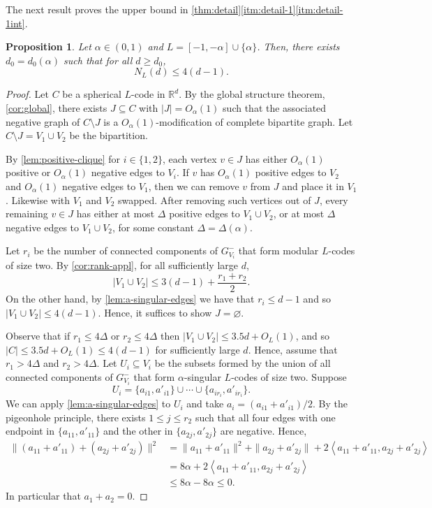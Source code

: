 \documentclass[reqno, 11pt]{amsart}
\newtheorem{proposition}[theorem]{Proposition}
\theoremstyle{definition}
\theoremstyle{remark}
\newcommand{\abs}[1]{\left\lvert#1\right\rvert}
\newcommand{\ang}[1]{\left\langle #1 \right\rangle}
\newcommand{\RR}{\mathbb{R}}
\begin{document}
The next result proves the upper bound in \cref{thm:detail}\ref{itm:detail-1}\ref{itm:detail-1int}.

\begin{proposition}\label{prop:upper}
    Let $ \alpha \in (0,1)$ and $L = [-1,-\alpha]\cup\{\alpha\}$. Then, there exists $d_0 = d_0(\alpha)$ such that for all $d \geq d_0$,
    \[
        N_L(d) \leq 4(d-1).
    \]
\end{proposition}

\begin{proof}
 Let $C$ be a spherical $L$-code in $\RR^d$. By the global structure theorem, \cref{cor:global}, there exists $J \subseteq C$ with $\abs{J} = O_\alpha(1)$ such that the associated negative graph of $C \setminus J$ is a $O_\alpha(1)$-modification of complete bipartite graph. Let $C \setminus J = V_1 \cup V_2$ be the bipartition.

By \cref{lem:positive-clique} for $i \in \{1,2\}$, each vertex $v \in J$ has either $O_\alpha(1)$ positive or $O_\alpha(1)$ negative edges to $V_i$. If $v$ has $O_\alpha(1)$ positive edges to $V_2$ and $O_\alpha(1)$ negative edges to $V_1$, then we can remove $v$ from $J$ and place it in $V_1$. Likewise with $V_1$ and $V_2$ swapped.
After removing such vertices out of $J$, every remaining $v \in J$ has either at most $\Delta$ positive edges to $V_1 \cup V_2$, or at most $\Delta$ negative edges to $V_1 \cup V_2$, for some constant $\Delta = \Delta(\alpha)$.

Let $r_i$ be the number of connected components of $G_{V_i}^-$ that form modular $L$-codes of size two. By \cref{cor:rank-appl}, for all sufficiently large $d$,
\[
    |V_1 \cup V_2| \leq 3(d-1) + \frac{r_1 + r_2}{2}.
\]
On the other hand, by \cref{lem:a-singular-edges} we have that $r_i \leq d-1$ and so $|V_1 \cup V_2| \leq 4(d-1)$. Hence, it suffices to show $J = \varnothing$.

Observe that if $r_1 \leq 4\Delta$ or $r_2 \leq 4\Delta$ then $|V_1 \cup V_2| \leq 3.5d + O_L(1)$, and so $\abs{C} \le 3.5d + O_L(1) \le 4(d-1)$ for sufficiently large $d$.
Hence, assume that $r_1 > 4\Delta$ and $r_2 > 4 \Delta$. Let $U_i \subseteq V_i$ be the subsets formed by the union of all connected components of $G_{V_i}^-$ that form $\alpha$-singular $L$-codes of size two. Suppose 
 \[
        U_i = \{a_{i1}, a'_{i1}\}\cup \cdots \cup \{a_{ir_i}, a'_{ir_i}\}.
\]  
We can apply \cref{lem:a-singular-edges} to $U_i$ and take $a_i =(a_{i1} + a'_{i1})/2$. By the pigeonhole principle, there exists $1 \leq j \leq r_2$ such that all four edges with one endpoint in $\{a_{11}, a'_{11}\}$ and the other in $\{a_{2j}, a'_{2j}\}$ are negative. Hence,
    \begin{align*}
        \| ( a_{11} + a'_{11}) + (a_{2j} + a'_{2j}) \|^2 &= \|a_{11} + a'_{11}\|^2 + \|a_{2j} + a'_{2j}\|+2\ang{   a_{11} + a'_{11}, a_{2j} + a'_{2j}}\\
        &= 8\alpha+2\ang{   a_{11} + a'_{11}, a_{2j} + a'_{2j}} \\
        &\leq 8\alpha - 8\alpha \leq 0.
    \end{align*}
    In particular that $a_1 + a_2 = 0$. 
    

\end{proof}
\end{document}

